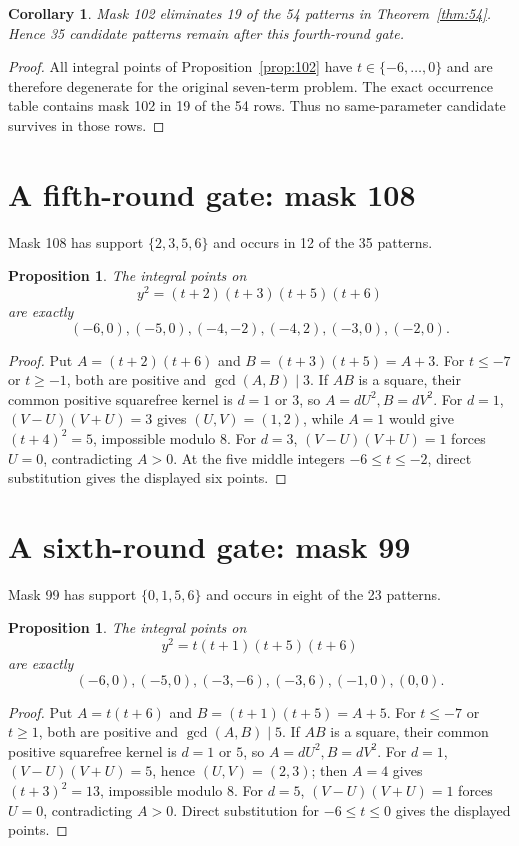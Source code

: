 \documentclass[11pt]{article}
\newtheorem{proposition}[theorem]{Proposition}
\newtheorem{corollary}[theorem]{Corollary}
\begin{document}
\begin{corollary}\label{cor:35}
Mask 102 eliminates 19 of the 54 patterns in
Theorem~\ref{thm:54}. Hence 35 candidate patterns remain after this
fourth-round gate.
\end{corollary}
\begin{proof}
All integral points of Proposition~\ref{prop:102} have
$t\in\{-6,\ldots,0\}$ and are therefore degenerate for the original
seven-term problem. The exact occurrence table contains mask 102 in
19 of the 54 rows. Thus no same-parameter candidate survives in those
rows.
\end{proof}

\section{A fifth-round gate: mask 108}
Mask 108 has support $\{2,3,5,6\}$ and occurs in 12 of the 35 patterns.

\begin{proposition}\label{prop:108}
The integral points on
\[
 y^2=(t+2)(t+3)(t+5)(t+6)
\]
are exactly
\[
 (-6,0),(-5,0),(-4,-2),(-4,2),(-3,0),(-2,0).
\]
\end{proposition}
\begin{proof}
Put $A=(t+2)(t+6)$ and $B=(t+3)(t+5)=A+3$.
For $t\leq-7$ or $t\geq-1$, both are positive and
$\gcd(A,B)\mid3$.  If $AB$ is a square, their common positive squarefree
kernel is $d=1$ or $3$, so $A=dU^2,B=dV^2$.
For $d=1$, $(V-U)(V+U)=3$ gives $(U,V)=(1,2)$, while $A=1$ would give
$(t+4)^2=5$, impossible modulo 8.  For $d=3$,
$(V-U)(V+U)=1$ forces $U=0$, contradicting $A>0$.
At the five middle integers $-6\leq t\leq-2$, direct substitution gives
the displayed six points.
\end{proof}

\section{A sixth-round gate: mask 99}
Mask 99 has support $\{0,1,5,6\}$ and occurs in eight of the 23 patterns.

\begin{proposition}\label{prop:99}
The integral points on
\[
 y^2=t(t+1)(t+5)(t+6)
\]
are exactly
\[
 (-6,0),(-5,0),(-3,-6),(-3,6),(-1,0),(0,0).
\]
\end{proposition}
\begin{proof}
Put $A=t(t+6)$ and $B=(t+1)(t+5)=A+5$.  For $t\leq-7$ or
$t\geq1$, both are positive and $\gcd(A,B)\mid5$.  If $AB$ is a
square, their common positive squarefree kernel is $d=1$ or $5$, so
$A=dU^2,B=dV^2$.  For $d=1$,
$(V-U)(V+U)=5$, hence $(U,V)=(2,3)$; then $A=4$ gives
$(t+3)^2=13$, impossible modulo $8$.  For $d=5$,
$(V-U)(V+U)=1$ forces $U=0$, contradicting $A>0$.
Direct substitution for $-6\leq t\leq0$ gives the displayed points.
\end{proof}
\end{document}

